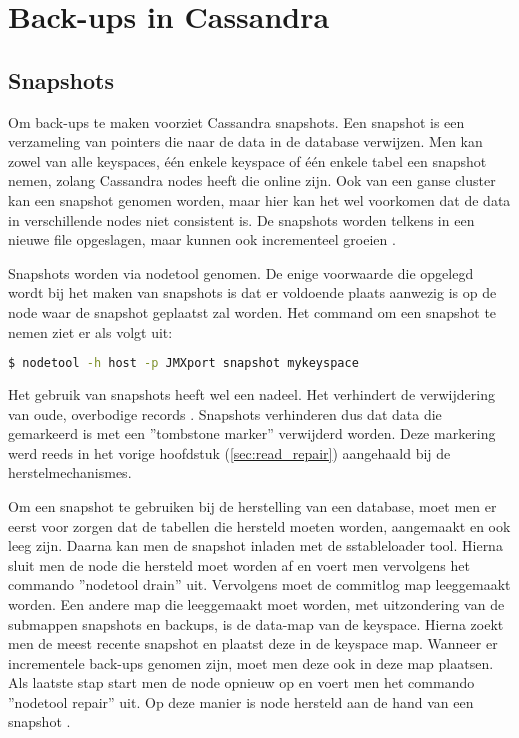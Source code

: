 \chapter{Back-ups in Cassandra}
\label{ch:cassandra_backups}

\section{Snapshots}
Om back-ups te maken voorziet Cassandra snapshots.
Een snapshot is een verzameling van pointers die naar de data in de database verwijzen.
Men kan zowel van alle keyspaces, één enkele keyspace of één enkele tabel een snapshot nemen, zolang Cassandra nodes heeft die online zijn.
Ook van een ganse cluster kan een snapshot genomen worden, maar hier kan het wel voorkomen dat de data in verschillende nodes niet consistent is.
De snapshots worden telkens in een nieuwe file opgeslagen, maar kunnen ook incrementeel groeien \citep{DataStax2016Snapshot}.

Snapshots worden via nodetool genomen.
De enige voorwaarde die opgelegd wordt bij het maken van snapshots is dat er voldoende plaats aanwezig is op de node waar de snapshot geplaatst zal worden.
Het command om een snapshot te nemen ziet er als volgt uit:

\begin{lstlisting}[language=Bash, breaklines=true]
$ nodetool -h host -p JMXport snapshot mykeyspace
\end{lstlisting}

Het gebruik van snapshots heeft wel een nadeel.
Het verhindert de verwijdering van oude, overbodige records \citep{DataStax2016Snapshot}.
Snapshots verhinderen dus dat data die gemarkeerd is met een ''tombstone marker'' verwijderd worden.
Deze markering werd reeds in het vorige hoofdstuk (\ref{sec:read_repair}) aangehaald bij de herstelmechanismes.

Om een snapshot te gebruiken bij de herstelling van een database, moet men er eerst voor zorgen dat de tabellen die hersteld moeten worden, aangemaakt en ook leeg zijn.
Daarna kan men de snapshot inladen met de sstableloader tool.
Hierna sluit men de node die hersteld moet worden af en voert men vervolgens het commando ''nodetool drain'' uit.
Vervolgens moet de commitlog map leeggemaakt worden.
Een andere map die leeggemaakt moet worden, met uitzondering van de submappen snapshots en backups, is de data-map van de keyspace.
Hierna zoekt men de meest recente snapshot en plaatst deze in de keyspace map.
Wanneer er incrementele back-ups genomen zijn, moet men deze ook in deze map plaatsen.
Als laatste stap start men de node opnieuw op en voert men het commando ''nodetool repair'' uit.
Op deze manier is node hersteld aan de hand van een snapshot \citep{DataStax2016Snapshot}.

